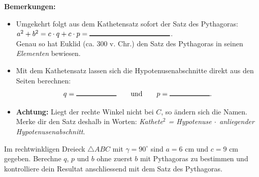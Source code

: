 \documentclass[11pt,oneside]{article}
\begin{document}
	{\bf Bemerkungen:}
	\begin{itemize}
		\item Umgekehrt folgt aus dem Kathetensatz sofort der Satz des Pythagoras: $a^2+b^2=c\cdot q+c\cdot p=\gap{4}$.\\[2mm] Genau so hat Euklid (ca. 300 v. Chr.) den Satz des Pythagoras in seinen \textit{Elementen} bewiesen.
		\item Mit dem Kathetensatz lassen sich die Hypotenusenabschnitte direkt aus den Seiten berechnen: \[q=\gap{2} \qquad\text{und}\qquad p=\gap{2}.\]
		\item {\bf Achtung:} Liegt der rechte Winkel nicht bei $C$, so ändern sich die Namen. Merke dir den Satz deshalb in Worten: \textit{Kathete$^2$ = Hypotenuse $\cdot$ anliegender Hypotenusenabschnitt}.
	\end{itemize}
	\begin{beispiel}
		Im rechtwinkligen Dreieck $\triangle ABC$ mit $\gamma=90^\circ$ sind $a=6$ cm und $c=9$ cm gegeben. Berechne $q$, $p$ und $b$ ohne zuerst $b$ mit Pythagoras zu bestimmen und kontrolliere dein Resultat anschliessend mit dem Satz des Pythagoras.
	\end{beispiel}
\end{document}
